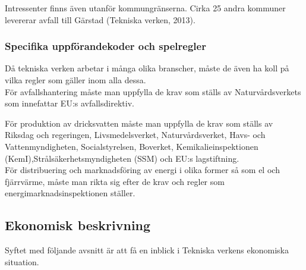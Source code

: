 \documentclass[10pt,a4paper]{article}
\begin{document}
Intressenter finns även utanför kommungränserna. Cirka 25 andra kommuner
levererar avfall till Gärstad (Tekniska verken, 2013).

\subsubsection{Specifika uppförandekoder och spelregler}
Då tekniska verken arbetar i många olika branscher, måste de även ha koll på
vilka regler som gäller inom alla dessa. \\

För avfallshantering måste man uppfylla de krav som ställs av Naturvårdsverkets
som innefattar EU:s avfallsdirektiv.

För produktion av dricksvatten måste man uppfylla de krav som ställs av Riksdag
och regeringen, Livsmedelsverket, Naturvårdsverket, Havs- och Vattenmyndigheten,
Socialstyrelsen, Boverket, Kemikalieinspektionen (KemI),Strålsäkerhetsmyndigheten 
(SSM) och EU:s lagstiftning.\\

För distribuering och marknadsföring av energi i olika former så som el och
fjärrvärme, måste man rikta sig efter de krav och regler som
energimarknadsinspektionen ställer.


\subsection{Ekonomisk beskrivning}
Syftet med följande avsnitt är att få en inblick i Tekniska verkens ekonomiska
situation.
\end{document}
